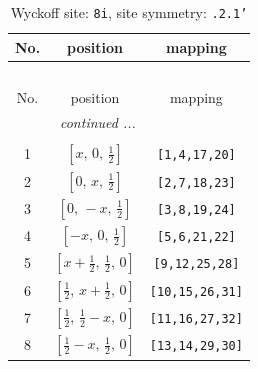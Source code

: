 \documentclass[fleqn,8pt]{jsarticle}
\begin{document}
\begin{longtable}{ccc}
\caption{Wyckoff site: {\tt 8i}, site symmetry: {\tt .2.1'}}
 \\
 \hline \hline
No. & position & mapping \\ \hline \endfirsthead

\multicolumn{2}{l}{\tablename\ \thetable{}} \\
 \hline \hline
No. & position & mapping \\ \hline \endhead

 \hline \hline
\multicolumn{2}{r}{\footnotesize\it continued ...} \\ \endfoot

 \hline \hline
\multicolumn{2}{r}{} \\ \endlastfoot

1 & $\left[ x,\, 0,\, \frac{1}{2} \right]$ & {\tt [1,4,17,20]} \\ \hline
2 & $\left[ 0,\, x,\, \frac{1}{2} \right]$ & {\tt [2,7,18,23]} \\ \hline
3 & $\left[ 0,\, - x,\, \frac{1}{2} \right]$ & {\tt [3,8,19,24]} \\ \hline
4 & $\left[ - x,\, 0,\, \frac{1}{2} \right]$ & {\tt [5,6,21,22]} \\ \hline
5 & $\left[ x + \frac{1}{2},\, \frac{1}{2},\, 0 \right]$ & {\tt [9,12,25,28]} \\ \hline
6 & $\left[ \frac{1}{2},\, x + \frac{1}{2},\, 0 \right]$ & {\tt [10,15,26,31]} \\ \hline
7 & $\left[ \frac{1}{2},\, \frac{1}{2} - x,\, 0 \right]$ & {\tt [11,16,27,32]} \\ \hline
8 & $\left[ \frac{1}{2} - x,\, \frac{1}{2},\, 0 \right]$ & {\tt [13,14,29,30]} \\
\end{longtable}
\renewcommand{\arraystretch}{1.2}
\end{document}
